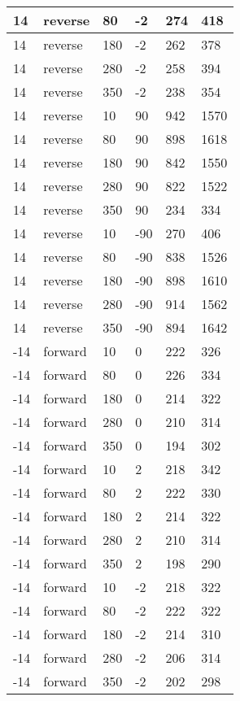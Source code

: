 \begin{table}
\begin{center}
\begin{tabular}{|l|l|l|l|l|l|}
			\hline
			14 & reverse & 80 & -2 & 274 & 418 \\
			\hline
			14 & reverse & 180 & -2 & 262 & 378 \\
			\hline
			14 & reverse & 280 & -2 & 258 & 394 \\
			\hline
			14 & reverse & 350 & -2 & 238 & 354 \\
			\hline
			14 & reverse & 10 & 90 & 942 & 1570 \\
			\hline
			14 & reverse & 80 & 90 & 898 & 1618 \\
			\hline
			14 & reverse & 180 & 90 & 842 & 1550 \\
			\hline
			14 & reverse & 280 & 90 & 822 & 1522 \\
			\hline
			14 & reverse & 350 & 90 & 234 & 334 \\
			\hline
			14 & reverse & 10 & -90 & 270 & 406 \\
			\hline
			14 & reverse & 80 & -90 & 838 & 1526 \\
			\hline
			14 & reverse & 180 & -90 & 898 & 1610 \\
			\hline
			14 & reverse & 280 & -90 & 914 & 1562 \\
			\hline
			14 & reverse & 350 & -90 & 894 & 1642 \\
			\hline
			-14 & forward & 10 & 0 & 222 & 326 \\
			\hline
			-14 & forward & 80 & 0 & 226 & 334 \\
			\hline
			-14 & forward & 180 & 0 & 214 & 322 \\
			\hline
			-14 & forward & 280 & 0 & 210 & 314 \\
			\hline
			-14 & forward & 350 & 0 & 194 & 302 \\
			\hline
			-14 & forward & 10 & 2 & 218 & 342 \\
			\hline
			-14 & forward & 80 & 2 & 222 & 330 \\
			\hline
			-14 & forward & 180 & 2 & 214 & 322 \\
			\hline
			-14 & forward & 280 & 2 & 210 & 314 \\
			\hline
			-14 & forward & 350 & 2 & 198 & 290 \\
			\hline
			-14 & forward & 10 & -2 & 218 & 322 \\
			\hline
			-14 & forward & 80 & -2 & 222 & 322 \\
			\hline
			-14 & forward & 180 & -2 & 214 & 310 \\
			\hline
			-14 & forward & 280 & -2 & 206 & 314 \\
			\hline
			-14 & forward & 350 & -2 & 202 & 298 \\

\end{tabular}
\end{center}
\end{table}
